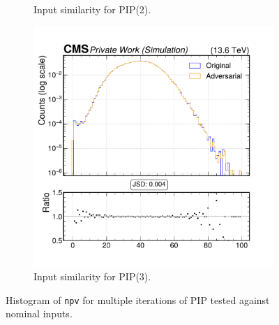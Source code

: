 \begin{figure}[h]
\begin{subfigure}[t]{0.32\textwidth}
    \caption{Input similarity for PIP(2).}
  \end{subfigure}\hfill
  \begin{subfigure}[t]{0.32\textwidth}
    \includegraphics[width=\linewidth]{media/output/features/compare/intprob_3/cmp_global_features_npv.pdf}
    \caption{Input similarity for PIP(3).}
  \end{subfigure}

  \caption{Histogram of \texttt{npv} for multiple iterations of PIP tested against nominal inputs.}
  \label{fig:intprob_input_npv}
\end{figure}
